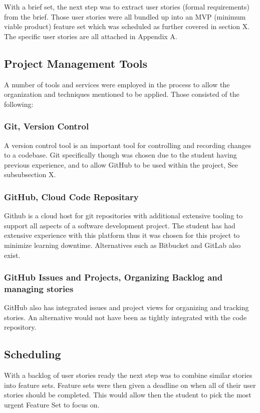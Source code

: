 With a brief set, the next step was to extract user stories (formal requirements) from the brief. Those user stories were all bundled up into an MVP (minimum viable product) feature set which was scheduled as further covered in section X. The specific user stories are all attached in Appendix A.

\subsection{Project Management Tools}
A number of tools and services were employed in the process to allow the organization and techniques mentioned to be applied. Those consisted of the following:

\subsubsection{Git, Version Control}
A version control tool is an important tool for controlling and recording changes to a codebase.
Git specifically though was chosen due to the student having previous experience, and to allow GitHub to be used within the project, See subsubsection X.

\subsubsection{GitHub, Cloud Code Repositary}
Github is a cloud host for git repositories with additional extensive tooling to support all aspects of a software development project. The student has had extensive experience with this platform thus it was chosen for this project to minimize learning downtime. Alternatives such as Bitbucket and GitLab also exist.

\subsubsection{GitHub Issues and Projects, Organizing Backlog and managing stories}
GitHub also has integrated issues and project views for organizing and tracking stories. An alternative would not have been as tightly integrated with the code repository.

\subsection{Scheduling}
With a backlog of user stories ready the next step was to combine similar stories into feature sets. Feature sets were then given a deadline on when all of their user stories should be completed.
This would allow then the student to pick the most urgent Feature Set to focus on.

